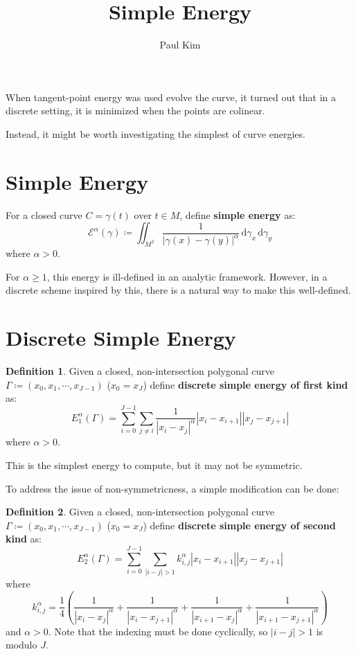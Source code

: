 \documentclass[a4paper]{article}
\title{Simple Energy}
\author{Paul Kim}
\newcommand{\dgamma}{\, \text{d}\gamma}
\theoremstyle{definition}
\newtheorem{definition}{Definition}
\begin{document}
\maketitle
When tangent-point energy was used evolve the curve, it turned out that in a discrete setting,
it is minimized when the points are colinear.

Instead, it might be worth investigating the simplest of curve energies.
\section{Simple Energy}
For a closed curve $C = \gamma(t)$ over $t \in M$, define \textbf{simple energy} as:
\begin{equation}
    \mathcal{E}^{\alpha} \left( \gamma \right) \coloneqq \iint_{M^2} \frac{1}{|\gamma(x) - \gamma(y)|^{\alpha}} \dgamma_x \dgamma_y
\end{equation}
where $\alpha > 0$.

For $\alpha \geq 1$, this energy is ill-defined in an analytic framework.
However, in a discrete scheme inspired by this, there is a natural way to make this well-defined.

\section{Discrete Simple Energy}
\begin{definition}
    Given a closed, non-intersection polygonal curve $\Gamma \coloneqq \left( x_0, x_1, \cdots, x_{J-1} \right)$
    ($x_0 = x_J$)
    define \textbf{discrete simple energy of first kind} as:
    \begin{equation}
        E_{1}^{\alpha}\left( \Gamma \right) = \sum_{i=0}^{J-1} \sum_{j \neq i} \frac{1}{|x_i -x_j|^{\alpha}} |x_i - x_{i+1}| |x_j - x_{j+1}|
    \end{equation}
    where $\alpha > 0$.
\end{definition}

This is the simplest energy to compute, but it may not be symmetric.

To address the issue of non-symmetricness, a simple modification can be done:
\begin{definition}
    Given a closed, non-intersection polygonal curve $\Gamma \coloneqq \left( x_0, x_1, \cdots, x_{J-1} \right)$
    ($x_0 = x_J$)
    define \textbf{discrete simple energy of second kind} as:
    \begin{equation}
        E_{2}^{\alpha}\left( \Gamma \right) = \sum_{i=0}^{J-1} \sum_{|i - j| > 1} k_{i,j}^{\alpha} |x_i - x_{i+1}| |x_j - x_{j+1}|
    \end{equation}
    where
    \begin{equation}
        k_{i,j}^{\alpha} = \frac{1}{4} \left( \frac{1}{|x_i - x_j|^{\alpha}} + \frac{1}{|x_{i} - x_{j+1}|^{\alpha}} + \frac{1}{|x_{i+1} - x_{j}|^{\alpha}} + \frac{1}{|x_{i+1} - x_{j+1}|^{\alpha}} \right)
    \end{equation}
    and $\alpha > 0$.
    Note that the indexing must be done cyclically, so $|i-j| > 1$ is modulo $J$.
\end{definition}
\end{document}
